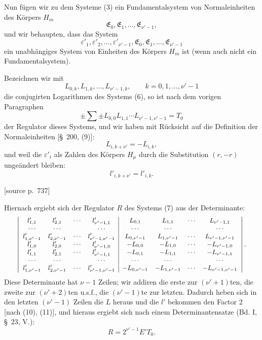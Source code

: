 \documentclass[11pt]{article}
\newcommand{\srcpage}[1]{\par\medskip\noindent\textsf{[source p.~#1]}\par\smallskip}
\begin{document}
Nun fügen wir zu dem Systeme (3) ein Fundamentalsystem von Normaleinheiten des Körpers $H_m$
\begin{equation}
\mathfrak E_0,\mathfrak E_1,\ldots,\mathfrak E_{\nu'-1},
\tag{6}
\end{equation}
und wir behaupten, dass das System
\begin{equation}
\varepsilon'_1,\varepsilon'_2,
\ldots,\varepsilon'_{\nu'-1},\mathfrak E_0,\mathfrak E_1,
\ldots,\mathfrak E_{\nu'-1}
\tag{7}
\end{equation}
ein unabhängiges System von Einheiten des Körpers $H_m$ ist (wenn auch nicht ein Fundamentalsystem).

Bezeichnen wir mit
\begin{equation}
L_{0,k},L_{1,k},\ldots,L_{\nu'-1,k},\qquad k=0,1,\ldots,\nu'-1
\tag{8}
\end{equation}
die conjugirten Logarithmen des Systems (6), so ist nach dem vorigen Paragraphen
\begin{equation}
\pm\sum\pm L_{0,0}L_{1,1}\cdots L_{\nu'-1,\nu'-1}=T_0
\tag{9}
\end{equation}
der Regulator dieses Systems, und wir haben mit Rücksicht auf die Definition der Normaleinheiten [\S~200, (9)]:
\begin{equation}
L_{i,k+\nu'}=-L_{i,k},
\tag{10}
\end{equation}
und weil die $\varepsilon'_i$ als Zahlen des Körpers $H_\mu$ durch die Substitution $(r,-r)$ ungeändert bleiben:
\begin{equation}
l'_{i,k+\nu'}=l'_{i,k}.
\tag{11}
\end{equation}

\srcpage{737}
Hiernach ergiebt sich der Regulator $R$ des Systems (7) aus der Determinante:
\[
\small
\left|\begin{array}{cccc|cccc}
l'_{1,1}&l'_{2,1}&\cdots&l'_{\nu'-1,1}&L_{0,1}&L_{1,1}&\cdots&L_{\nu'-1,1}\\
\cdots&\cdots&&\cdots&\cdots&\cdots&&\cdots\\
l'_{1,\nu'-1}&l'_{2,\nu'-1}&\cdots&l'_{\nu'-1,\nu'-1}&L_{0,\nu'-1}&L_{1,\nu'-1}&\cdots&L_{\nu'-1,\nu'-1}\\
l'_{1,0}&l'_{2,0}&\cdots&l'_{\nu'-1,0}&-L_{0,0}&-L_{1,0}&\cdots&-L_{\nu'-1,0}\\
l'_{1,1}&l'_{2,1}&\cdots&l'_{\nu'-1,1}&-L_{0,1}&-L_{1,1}&\cdots&-L_{\nu'-1,1}\\
\cdots&\cdots&&\cdots&\cdots&\cdots&&\cdots\\
l'_{1,\nu'-1}&l'_{2,\nu'-1}&\cdots&l'_{\nu'-1,\nu'-1}&-L_{0,\nu'-1}&-L_{1,\nu'-1}&\cdots&-L_{\nu'-1,\nu'-1}
\end{array}\right|.
\]
Diese Determinante hat $\nu-1$ Zeilen; wir addiren die erste zur $(\nu'+1)$ten, die zweite zur $(\nu'+2)$ten u.s.f., die $(\nu'-1)$te zur letzten. Dadurch heben sich in den letzten $(\nu'-1)$ Zeilen die $L$ heraus und die $l'$ bekommen den Factor 2 [nach (10), (11)], und hieraus ergiebt sich nach einem Determinantensatze (Bd. I, \S~23, V.):
\begin{equation}
R=2^{\nu'-1}E'T_0.
\tag{12}
\end{equation}
\end{document}
